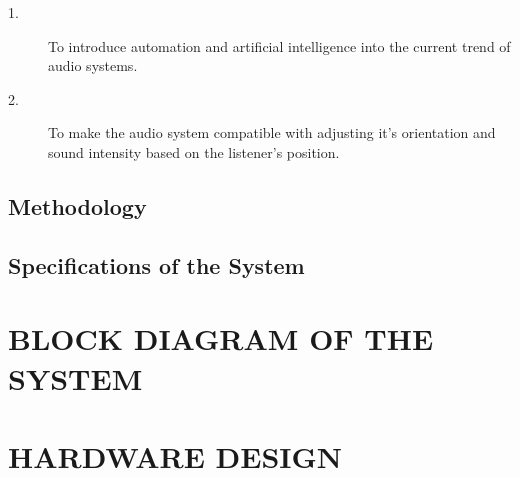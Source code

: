 \documentclass[twocolumn]{report}
\begin{document}
\begin{description}
    
    \item[1.]To introduce automation and artificial intelligence into the current 
    trend of audio systems.
    \item[2.]To make the audio system compatible with adjusting it’s orientation 
    and sound intensity based on the listener’s position.

\end{description}

\section{Methodology}



\section{Specifications of the System}



\chapter{BLOCK DIAGRAM OF THE SYSTEM}



\chapter{HARDWARE DESIGN}


\end{document}

